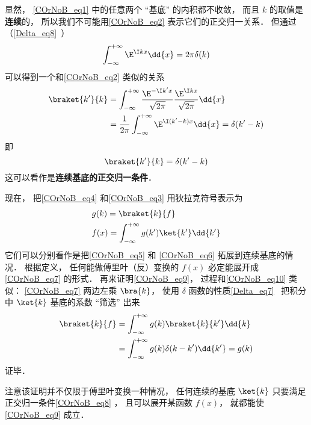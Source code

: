 显然， \autoref{COrNoB_eq1} 中的任意两个 “基底” 的内积都不收敛， 而且 $k$ 的取值是\textbf{连续}的， 所以我们不可能用\autoref{COrNoB_eq2} 表示它们的正交归一关系． 但通过（\autoref{Delta_eq8}~）
\begin{equation}
\int_{-\infty}^{+\infty} \E^{\I kx}\dd{x} = 2\pi \delta(k)
\end{equation}
可以得到一个和\autoref{COrNoB_eq2} 类似的关系
\begin{equation}
\begin{aligned}
\braket{k'}{k} &= \int_{-\infty}^{+\infty} \frac{\E^{-\I k'x}}{\sqrt{2\pi}} \frac{\E^{\I kx}}{\sqrt{2\pi}}\dd{x}\\
&= \frac{1}{2\pi}\int_{-\infty}^{+\infty} \E^{\I (k'-k)x}\dd{x}
= \delta(k' - k)
\end{aligned}
\end{equation}
即
\begin{equation}\label{COrNoB_eq8}
\braket{k'}{k} = \delta(k' - k)
\end{equation}
这可以看作是\textbf{连续基底的正交归一条件}．

现在， 把\autoref{COrNoB_eq4}  和\autoref{COrNoB_eq3} 用狄拉克符号表示为
\begin{align}\label{COrNoB_eq9}
&g(k) = \braket{k}{f}\\
\label{COrNoB_eq7}&f(x) = \int_{-\infty}^{+\infty} g(k') \ket{k'} \dd{k'}
\end{align}
它们可以分别看作是把\autoref{COrNoB_eq5} 和 \autoref{COrNoB_eq6} 拓展到连续基底的情况． 根据定义， 任何能做傅里叶（反）变换的 $f(x)$ 必定能展开成\autoref{COrNoB_eq7} 的形式． 再来证明\autoref{COrNoB_eq9}， 过程和\autoref{COrNoB_eq10} 类似： \autoref{COrNoB_eq7} 两边左乘 $\bra{k}$， 使用 $\delta$ 函数的性质\autoref{Delta_eq7}~ 把积分中 $\ket{k}$ 基底的系数 “筛选” 出来
\begin{equation}
\begin{aligned}
\braket{k}{f} &= \int_{-\infty}^{+\infty} g(k) \braket{k}{k'} \dd{k}\\
&= \int_{-\infty}^{+\infty} g(k) \delta(k-k') \dd{k'}
= g(k)
\end{aligned}
\end{equation}
证毕．

注意该证明并不仅限于傅里叶变换一种情况， 任何连续的基底 $\ket{k}$ 只要满足正交归一条件\autoref{COrNoB_eq8} ， 且可以展开某函数 $f(x)$， 就都能使\autoref{COrNoB_eq9} 成立．
